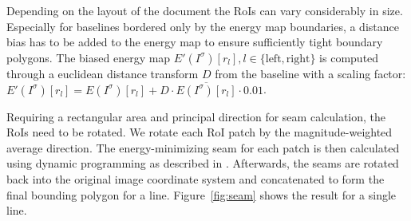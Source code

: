 Depending on the layout of the document the RoIs can vary considerably in size.
Especially for baselines bordered only by the energy map boundaries, a distance
bias has to be added to the energy map to ensure sufficiently tight boundary
polygons. The biased energy map $E'(I^\sigma)[r_l], l \in \{\text{left}, \text{right}\}$ is
computed through a euclidean distance transform $D$ from the baseline with a
scaling factor: $E'(I^\sigma)[r_l] = E(I^\sigma)[r_l] +
D \cdot \overline{E(I^\sigma)[r_l]}\cdot 0.01$.  

Requiring a rectangular area and principal direction for seam calculation, the
RoIs need to be rotated. We rotate each RoI patch by the magnitude-weighted
average direction. The energy-minimizing seam for each patch is then calculated
using dynamic programming as described in \cite{avidan2007seam}. Afterwards,
the seams are rotated back into the original image coordinate system and
concatenated to form the final bounding polygon for a line. Figure~\ref{fig:seam}
shows the result for a single line.

